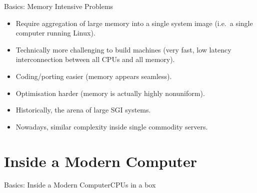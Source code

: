 \begin{frame}{Basics: Memory Intensive Problems}
\begin{itemize}
\item{Require aggregation of large memory into a \alert{single system image} (i.e.\ a single computer running Linux).}
\pause
\item{Technically more challenging to build machines (very fast, low latency interconnection between \alert{all} CPUs and \alert{all} memory).}
\pause
\item{Coding/porting easier (memory appears seamless).}
\pause
\item{Optimisation harder (memory is actually highly nonuniform).}
\pause
\item{Historically, the arena of large \alert{SGI} systems.}
\pause
\item{Nowadays, similar complexity inside single commodity servers.}
\end{itemize}
\end{frame}

\section{Inside a Modern Computer}
\begin{frame}{Basics: Inside a Modern Computer}{CPUs in a box}
%
\end{frame}

